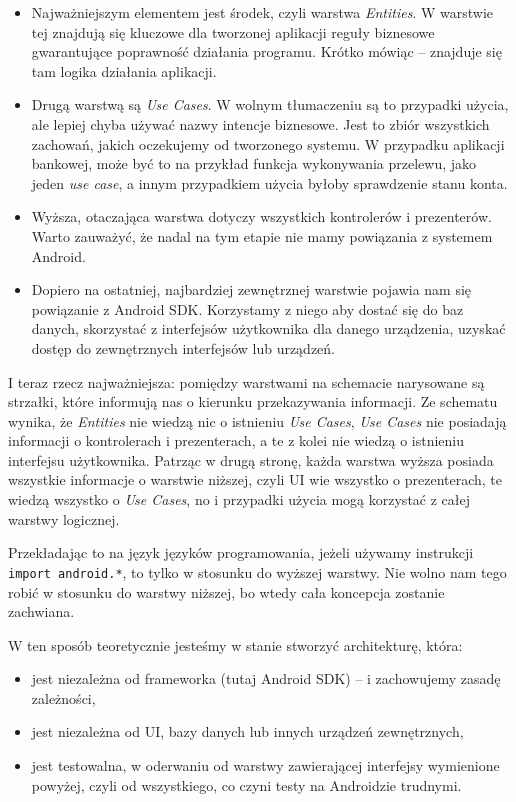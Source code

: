 \begin{itemize}

\item
Najważniejszym elementem jest środek, czyli warstwa \textit{Entities}. W warstwie tej znajdują się kluczowe dla tworzonej aplikacji reguły biznesowe gwarantujące poprawność działania programu. Krótko mówiąc – znajduje się tam logika działania aplikacji.
\item
Drugą warstwą są \textit{Use Cases}. W wolnym tłumaczeniu są to przypadki użycia, ale lepiej chyba używać nazwy intencje biznesowe. Jest to zbiór wszystkich zachowań, jakich oczekujemy od tworzonego systemu. W przypadku aplikacji bankowej, może być to na przykład funkcja wykonywania przelewu, jako jeden \textit{use case}, a innym przypadkiem użycia byłoby sprawdzenie stanu konta.
\item
Wyższa, otaczająca warstwa dotyczy wszystkich kontrolerów i prezenterów. Warto zauważyć, że nadal na tym etapie nie mamy powiązania z systemem Android.
\item
Dopiero na ostatniej, najbardziej zewnętrznej warstwie pojawia nam się powiązanie z Android SDK. Korzystamy z niego aby dostać się do baz danych, skorzystać z interfejsów użytkownika dla danego urządzenia, uzyskać dostęp do zewnętrznych interfejsów lub urządzeń.
\end{itemize}

I teraz rzecz najważniejsza: pomiędzy warstwami na schemacie narysowane są strzałki, które informują nas o kierunku przekazywania informacji. Ze schematu wynika, że \textit{Entities} nie wiedzą nic o istnieniu \textit{Use Cases}, \textit{Use Cases} nie posiadają informacji o kontrolerach i prezenterach, a te z kolei nie wiedzą o istnieniu interfejsu użytkownika. Patrząc w drugą stronę, każda warstwa wyższa posiada wszystkie informacje o warstwie niższej, czyli UI wie wszystko o prezenterach, te wiedzą wszystko o \textit{Use Cases}, no i przypadki użycia mogą korzystać z całej warstwy logicznej.

Przekładając to na język języków programowania, jeżeli używamy instrukcji \texttt{import android.*}, to tylko w stosunku do wyższej warstwy. Nie wolno nam tego robić w stosunku do warstwy niższej, bo wtedy cała koncepcja zostanie zachwiana.

W ten sposób teoretycznie jesteśmy w stanie stworzyć architekturę, która:
\begin{itemize}
\item
jest niezależna od frameworka (tutaj Android SDK) – i zachowujemy zasadę zależności,
\item
jest niezależna od UI, bazy danych lub innych urządzeń zewnętrznych,
\item
jest testowalna, w oderwaniu od warstwy zawierającej interfejsy wymienione powyżej, czyli od wszystkiego, co czyni testy na Androidzie trudnymi.
\end{itemize}

